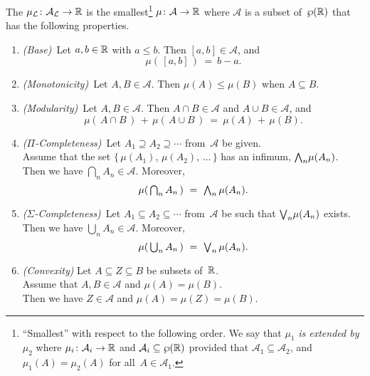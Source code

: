 \documentclass[main.tex]{subfiles}
\begin{document}
\begin{dfn}
\label{D:lebesgue-measure}
The 
$\mu_{\mathcal{L}} \colon \mathcal{A}_{\mathcal{L}} \rightarrow \mathbb{R}$
is the smallest\footnote{%
``Smallest'' with respect to the following order.
We say that $\mu_1$ \emph{is extended by}~$\mu_2$
where $\mu_i\colon \mathcal{A}_i \rightarrow \mathbb{R}$
and $\mathcal{A}_i \subseteq \wp(\mathbb{R})$
provided that
$\mathcal{A}_1 \subseteq \mathcal{A}_2$,
and $\mu_1(A) = \mu_2(A)$
for all~$A\in\mathcal{A}_1$.}
$\mu\colon \mathcal{A} \rightarrow \mathbb{R}$
where $\mathcal{A}$ is a subset of~$\wp(\mathbb{R})$
that has the following properties.
\begin{enumerate}
\item
\label{prop:measure-1}
\textit{(Base)}\ 
Let $a,b\in\mathbb{R}$ with $a\leq b$. Then $[a,b]\in\mathcal{A}$, and
\begin{equation*}
\mu(\,[a,b]\,)\ =\ b-a.
\end{equation*}

\item
\label{prop:measure-2}
\textit{(Monotonicity)}\ 
Let $A,B\in \mathcal{A}$.
Then $\mu(A)\leq \mu(B)$
when  $A\subseteq B$.

\item
\label{prop:measure-3}
\textit{(Modularity)}\ 
Let $A,B\in \mathcal{A}$.
Then $A\cap B\in\mathcal{A}$ and $A\cup B \in \mathcal{A}$, and
\begin{equation*}
\mu(\,A\cap B\,)\,+\,\mu(\,A\cup B\,)\ =\ \mu(A)\,+\,\mu(B).
\end{equation*}

\item
\label{prop:measure-4}
\textit{($\Pi$-Completeness)}\ 
Let $A_1 \supseteq A_2 \supseteq \dotsb$
from~$\mathcal{A}$ be given.\\
Assume that the set $\{\,\mu(A_1),\, \mu(A_2),\, \dotsc\,\}$
has an infimum, $\textstyle{\bigwedge}_n \mu(A_n)$.\\
Then we have $\bigcap_n A_n \in \mathcal{A}$.
Moreover,
\begin{equation*}
\mu(\, \textstyle{ \bigcap_n A_n }\,) \ =\ \textstyle{\bigwedge}_n \,\mu(A_n).
\end{equation*}

\item
\label{prop:measure-5}
\textit{($\Sigma$-Completeness)}\ 
Let $A_1 \subseteq A_2 \subseteq \dotsb$
from~$\mathcal{A}$ 
be such that $\textstyle{\bigvee}_n \mu(A_n)$ exists.\\
Then we have $\bigcup_n A_n \in \mathcal{A}$.
Moreover,
\begin{equation*}
\mu(\, \textstyle{ \bigcup_n A_n }\,) \ =\ \textstyle{\bigvee}_n \,\mu(A_n).
\end{equation*}

\item
\label{prop:measure-6}
\textit{(Convexity)}
Let $A\subseteq Z \subseteq B$ be subsets of~$\mathbb{R}$.\\
Assume that $A,B\in\mathcal{A}$ and $\mu(A)=\mu(B)$.\\
Then we have $Z\in \mathcal{A}$ and $\mu(A) = \mu(Z)= \mu(B)$.
\end{enumerate}
\end{dfn}
\end{document}
